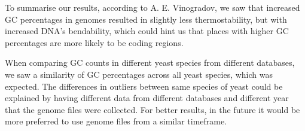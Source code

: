 To summarise our results, according to A. E. Vinogradov, we saw that increased GC percentages in genomes resulted in slightly less thermostability, but with increased DNA's bendability, which could hint us that places with higher GC percentages are more likely to be coding regions.

When comparing GC counts in different yeast species from different databases, we saw a similarity of GC percentages across all yeast species, which was expected. The differences in outliers between same species of yeast could be explained by having different data from different databases and different year that the genome files were collected. For better results, in the future it would be more preferred to use genome files from a similar timeframe.
